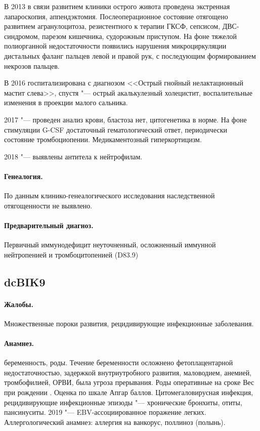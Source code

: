 \documentclass[a4paper,14pt]{extarticle}
\newcommand{\gramm}{г}
\newcommand{\months}{мес.}
\newcommand{\weeks}{нед.}
\begin{document}
В 2013 в связи развитием клиники острого живота проведена экстренная лапароскопия, аппендэктомия.
Послеоперационное состояние отягощено развитием агранулоцитоза, резистентного к терапии ГКСФ, сепсисом, ДВС-синдромом, парезом кишечника, судорожным приступом.
На фоне тяжелой полиорганной недостаточности появились нарушения микроциркуляции дистальных фаланг пальцев левой и правой рук, с последующим формированием некрозов пальцев.

В 2016 госпитализирована с диагнозом <<Острый гнойный нелактационный мастит слева>>, \numprint[\months]{2} спустя "--- острый акалькулезный холецистит, воспалительные изменения в проекции малого сальника.

2017 "--- проведен анализ крови, бластоза нет, цитогенетика в норме.
На фоне стимуляции G-CSF достаточный гематологический ответ, периодически состояние тромбоциопении.
Медикаментозный гиперкортицизм.

2018 "--- выявлены антитела к нейтрофилам.

\paragraph{Генеалогия.}
По данным клинико-генеалогического исследования наследственной отягощенности не выявлено.

\paragraph{Предварительный диагноз.}
Первичный иммунодефицит неуточненный, осложненный иммунной нейтропенией и тромбоцитопенией (D83.9)

\subsection*{dcBIK9}

\paragraph{Жалобы.}
Множественные пороки развития, рецидивирующие инфекционные заболевания.

\paragraph{Анамнез.}
 беременность,  роды.
Течение беременности осложнено фетоплацентарной недостаточностью, задержкой внутриутробного развития, маловодием, анемией, тромбофилией, ОРВИ, была угроза прерывания.
Роды оперативные на сроке \numprint[\weeks]{38}
Вес при рождении \numprint[\gramm]{2600}.
Оценка по шкале Апгар  баллов.
Цитомегаловирусная инфекция, рецидивирующие инфекционные эпизоды "--- хронические бронхиты, отиты, пансинуситы.
2019 "--- EBV-ассоциированное поражение легких.
Аллергологический анамнез: аллергия на ванкорус, поллиноз (полынь).
\end{document}
